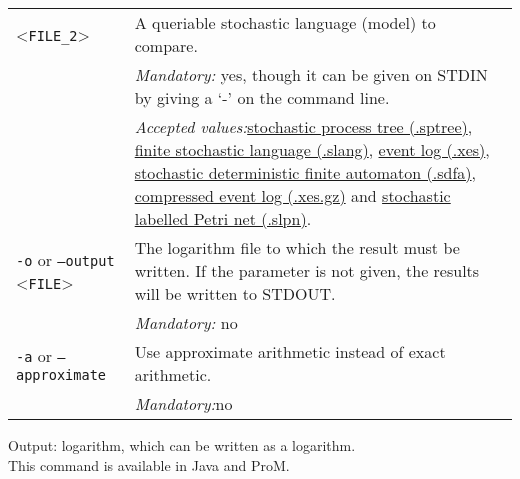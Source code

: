 {\begin{tabularx}{\linewidth}{lX}
<\texttt{FILE\_2}>&A queriable stochastic language (model) to compare.\\
&\textit{Mandatory:} \quad yes, though it can be given on STDIN by giving a `-' on the command line.\\
&\textit{Accepted values:}\quad \hyperref[filehandler:stochastic process tree]{stochastic process tree (.sptree)}, \hyperref[filehandler:finite stochastic language]{finite stochastic language (.slang)}, \hyperref[filehandler:event log]{event log (.xes)}, \hyperref[filehandler:stochastic deterministic finite automaton]{stochastic deterministic finite automaton (.sdfa)}, \hyperref[filehandler:compressed event log]{compressed event log (.xes.gz)} and \hyperref[filehandler:stochastic labelled Petri net]{stochastic labelled Petri net (.slpn)}.\\
\texttt{-o} or \texttt{--output} <\texttt{FILE}> &
The logarithm file to which the result must be written. If the parameter is not given, the results will be written to STDOUT.\\
&\textit{Mandatory:} \quad no\\
\texttt{-a} or \texttt{--approximate} & Use approximate arithmetic instead of exact arithmetic.\\
&\textit{Mandatory:}\quad no\\
\bottomrule
\end{tabularx}
\noindent Output: logarithm, which can be written as a logarithm.
\\This command is available in Java and ProM.
}
